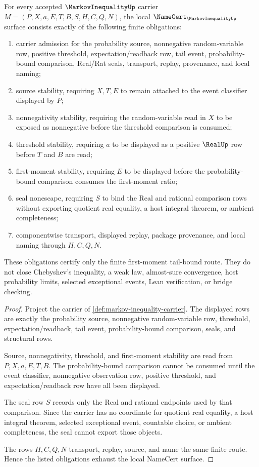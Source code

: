 \begin{theorem}\label{thm:markov-inequality-namecert-obligations}
For every accepted $\MarkovInequalityUp$ carrier $M=(P,X,a,E,T,B,S,H,C,Q,N)$, the local $\NameCert_{\MarkovInequalityUp}$ surface consists exactly of the following finite obligations:
\begin{enumerate}
\item carrier admission for the probability source, nonnegative random-variable row, positive threshold, expectation/readback row, tail event, probability-bound comparison, Real/Rat seals, transport, replay, provenance, and local naming;
\item source stability, requiring $X,T,E$ to remain attached to the event classifier displayed by $P$;
\item nonnegativity stability, requiring the random-variable read in $X$ to be exposed as nonnegative before the threshold comparison is consumed;
\item threshold stability, requiring $a$ to be displayed as a positive $\RealUp$ row before $T$ and $B$ are read;
\item first-moment stability, requiring $E$ to be displayed before the probability-bound comparison consumes the first-moment ratio;
\item seal nonescape, requiring $S$ to bind the Real and rational comparison rows without exporting quotient real equality, a host integral theorem, or ambient completeness;
\item componentwise transport, displayed replay, package provenance, and local naming through $H,C,Q,N$.
\end{enumerate}
These obligations certify only the finite first-moment tail-bound route. They do not close Chebyshev's inequality, a weak law, almost-sure convergence, host probability limits, selected exceptional events, Lean verification, or bridge checking.
\end{theorem}
\begin{proof}
Project the carrier of \autoref{def:markov-inequality-carrier}. The displayed rows are exactly the probability source, nonnegative random-variable row, threshold, expectation/readback, tail event, probability-bound comparison, seals, and structural rows.

Source, nonnegativity, threshold, and first-moment stability are read from $P,X,a,E,T,B$. The probability-bound comparison cannot be consumed until the event classifier, nonnegative observation row, positive threshold, and expectation/readback row have all been displayed.

The seal row $S$ records only the Real and rational endpoints used by that comparison. Since the carrier has no coordinate for quotient real equality, a host integral theorem, selected exceptional event, countable choice, or ambient completeness, the seal cannot export those objects.

The rows $H,C,Q,N$ transport, replay, source, and name the same finite route. Hence the listed obligations exhaust the local NameCert surface.
\end{proof}


